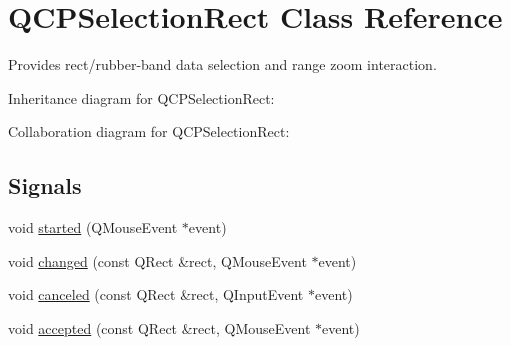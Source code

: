 \hypertarget{classQCPSelectionRect}{}\section{Q\+C\+P\+Selection\+Rect Class Reference}
\label{classQCPSelectionRect}


Provides rect/rubber-\/band data selection and range zoom interaction.  




Inheritance diagram for Q\+C\+P\+Selection\+Rect\+:


Collaboration diagram for Q\+C\+P\+Selection\+Rect\+:
\subsection*{Signals}
\begin{DoxyCompactItemize}
\item 
void \hyperlink{classQCPSelectionRect_a7b7162d19f4f2174d3644ff1a5d335aa}{started} (Q\+Mouse\+Event $\ast$event)
\item 
void \hyperlink{classQCPSelectionRect_a1bab11026bca52740c2e6682623e6964}{changed} (const Q\+Rect \&rect, Q\+Mouse\+Event $\ast$event)
\item 
void \hyperlink{classQCPSelectionRect_aeb82009393c90130102dccf36477b906}{canceled} (const Q\+Rect \&rect, Q\+Input\+Event $\ast$event)
\item 
void \hyperlink{classQCPSelectionRect_a15a43542e1f7b953a44c260b419e6d2c}{accepted} (const Q\+Rect \&rect, Q\+Mouse\+Event $\ast$event)
\end{DoxyCompactItemize}
